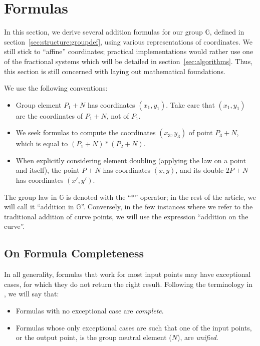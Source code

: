 \documentclass{llncs}
\newcommand{\bG}{\mathbb{G}}
\begin{document}

\section{Formulas}\label{sec:formulas}

In this section, we derive several addition formulas for our group
$\bG$, defined in section~\ref{sec:structure:groupdef}, using various
representations of coordinates. We still stick to ``affine''
coordinates; practical implementations would rather use one of the
fractional systems which will be detailed in
section~\ref{sec:algorithms}. Thus, this section is still concerned with
laying out mathematical foundations.

We use the following conventions:
\begin{itemize}

    \item Group element $P_1+N$ has coordinates $(x_1,y_1)$. Take care
    that $(x_1,y_1)$ are the coordinates of $P_1+N$, not of $P_1$.

    \item We seek formulas to compute the coordinates $(x_3,y_3)$ of
    point $P_3+N$, which is equal to $(P_1+N)*(P_2+N)$.

    \item When explicitly considering element doubling (applying the
    law on a point and itself), the point $P+N$ has coordinates $(x,y)$,
    and its double $2P+N$ has coordinates $(x',y')$.

\end{itemize}

The group law in $\bG$ is denoted with the ``$*$'' operator; in the rest
of the article, we will call it ``addition in $\bG$''. Conversely, in the
few instances where we refer to the traditional addition of curve points,
we will use the expression ``addition on the curve''.

\subsection{On Formula Completeness}\label{sec:formulas:completeness}

In all generality, formulas that work for most input points may have
exceptional cases, for which they do not return the right result.
Following the terminology in \cite{BerLan2007}, we will say that:
\begin{itemize}

    \item Formulas with no exceptional case are \emph{complete}.

    \item Formulas whose only exceptional cases are such that one of the
    input points, or the output point, is the group neutral element
    ($N$), are \emph{unified}.

\end{itemize}
\end{document}
